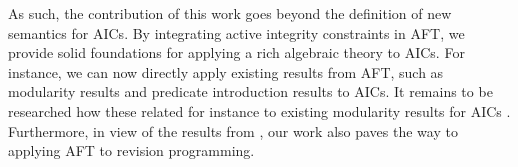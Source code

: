 
As such, the contribution of this work goes beyond the definition of new semantics for AICs. 
By integrating active integrity constraints in AFT, we provide solid foundations for applying a rich algebraic theory to AICs.
For instance, we can now directly apply existing results from AFT, such as modularity results and predicate introduction results to AICs. 
It remains to be researched how these related for instance to existing modularity results for AICs \cite{foiks/Cruz-Filipe14,iclp/Cruz-Filipe16}. 
Furthermore, in view of the results from \citet{tplp/CaropreseT11}, our work also paves the way to applying AFT to revision programming.


